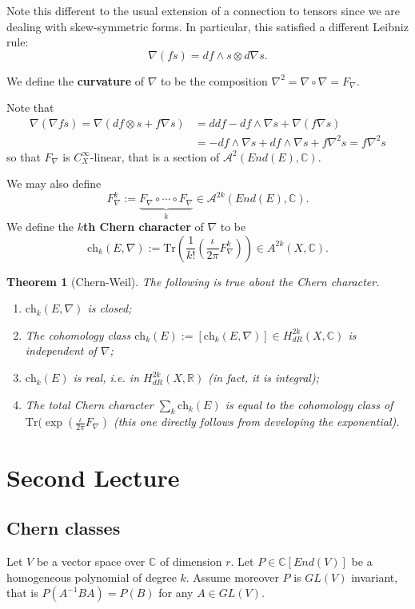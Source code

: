 \documentclass[11pt]{amsart}
\newcommand{\cA}{\mathcal{A}}
\newcommand{\tbf}[1]{\textbf{#1}}
\newcommand{\Tr}{\text{Tr}}
\newcommand{\R}{\mathbb R}
\newcommand{\C}{\mathbb C}
\newcommand{\pa}[1]{\left(#1\right)}
\newtheorem{theorem}{Theorem}[subsection]
\theoremstyle{definition}
\numberwithin{equation}{section}
\begin{document}
\begin{remark}
	Note this different to the usual extension of a connection to tensors since we are dealing with skew-symmetric forms. In particular, this satisfied a different Leibniz rule:
	\[
	\nabla(fs)=df\wedge s\otimes d\nabla s.
	\]
\end{remark}

\begin{definition}
	We define the \tbf{curvature} of $\nabla$ to be the composition $\nabla^2=\nabla\circ\nabla=F_\nabla$.
\end{definition}

Note that
\begin{align*}
 \nabla(\nabla fs)=\nabla(df\otimes s+f\nabla s)&=ddf-df\wedge\nabla s+\nabla(f\nabla s)	\\
 &=-df\wedge\nabla s+df\wedge\nabla s+f\nabla^2s=f\nabla^2s
\end{align*}
so that $F_\nabla$ is $C^\infty_X$-linear, that is a section of $\cA^2(End(E),\C)$.

We may also define
%
\[F_\nabla^k:=\underbrace{F_\nabla\circ\cdots\circ F_\nabla}_k\in \cA^{2k}(End(E),\C).
\]
We define the \tbf{$k$th Chern character} of $\nabla$ to be
%
\[
\text{ch}_k(E,\nabla):= \Tr\pa{\frac{1}{k!}\pa{\frac{\iota}{2\pi}F_\nabla^k}}\in A^{2k}(X,\C).
\]

\begin{theorem}[Chern-Weil]
The following is true about the Chern character.
\begin{enumerate}
	\item $\text{ch}_k(E,\nabla)$ is closed;
	\item The cohomology class $\text{ch}_k(E):=[\text{ch}_k(E,\nabla)]\in H^{2k}_{dR}(X,\C)$ is independent of $\nabla$;
	\item $\text{ch}_k(E)$ is real, i.e. in $H^{2k}_{dR}(X,\R)$ (in fact, it is integral);
	\item The total Chern character $\sum_k\text{ch}_k(E)$ is equal to the cohomology class of $\Tr(\exp(\frac{\iota}{2\pi}F_\nabla)$ (this one directly follows from developing the exponential).
\end{enumerate}	
\end{theorem}

\section{Second Lecture}
\subsection{Chern classes}
Let $V$ be a vector space over $\C$ of dimension $r$. Let $P\in \C[End(V)]$ be a homogeneous polynomial of degree $k$. Assume moreover $P$ is $GL(V)$ invariant, that is $P(A^{-1}BA)=P(B)$ for any $A\in GL(V)$.
\end{document}

